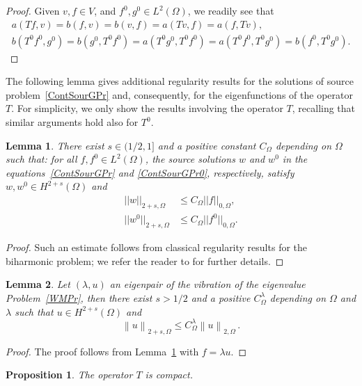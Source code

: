 \documentclass[final,reqno]{elsarticle}
\newtheorem{lemma}{Lemma}[section]
\newtheorem{proposition}{Proposition}[section]
\begin{document}
\begin{proof} Given $v,f\in V$, and $f^0,g^0\in L^2(\Omega)$, we readily see that
\begin{gather*}
a(T f,v)
=b (f,v)
=b (v,f)
=a(T v,f)
=a(f,T v), \\
b(T^0f^0,g^0)
	=b(g^0,T^0f^0)
	=a(T^0g^0,T^0f^0)
	=a(T^0f^0,T^0g^0)
	=b(f^0,T^0g^0).
\end{gather*}
\end{proof}

The following lemma gives additional regularity results for the solutions of source problem~\eqref{ContSourGPr} and, consequently, for the eigenfunctions of the operator $T$. For simplicity, we only show the results involving the operator $T$, recalling that similar arguments hold also for $T^0$.


\begin{lemma}\label{lem:uZero}
There exist $s\in(1/2,1]$ and a positive constant $C_{\Omega}$ depending on $\Omega$ such that: 
for all $f,f^0\in L^2(\Omega)$, the source solutions $ w $ and $w^0$ in the  equations~\eqref{ContSourGPr} and \eqref{ContSourGPr0}, respectively, 
satisfy $ w,w^0 \in H^{2+s}(\Omega)$
and 
\begin{align}
|| w ||_{2+s,\Omega} &\leq C_{\Omega} ||f||_{0,\Omega},\nonumber\\[1ex]
|| w^0 ||_{2+s,\Omega}& \leq C_{\Omega} ||f^0||_{0,\Omega}.\nonumber
\end{align}
\end{lemma}
\begin{proof}
Such an estimate follows from classical regularity results for the biharmonic problem; we refer the reader to \cite{BRM2AS80,G,savare98} for further details.
\end{proof}

\begin{lemma}
Let $(\lambda,u)$ an eigenpair  of the vibration of the eigenvalue Problem~\ref{WMPr}, then there exist $s>1/2$ and a positive  $C_{\Omega}^{\lambda}$ depending on $\Omega$ and $\lambda$ such that $u\in H^{2+s}(\Omega)$ and
$$
\left\|u\right\|_{2+s,\Omega}
\le C_{\Omega}^{\lambda}\left\|u\right\|_{2,\Omega}\,.
$$  
\label{lem:uStar}
\end{lemma}

\begin{proof}
The proof follows from Lemma~\ref{lem:uZero} with $f = \lambda u $.
\end{proof}

\begin{proposition}
The operator $T$ is compact. 
\end{proposition}
\end{document}
